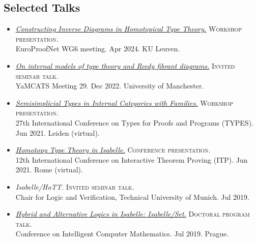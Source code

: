 \documentclass[12pt,a4paper]{article}
\begin{document}
\subsection{Selected Talks}

\newcommand{\vid}{{\scriptsize\faVideoCamera}\hspace{0.5ex}}
\newcommand{\slides}{{\scriptsize\faDesktop}\hspace{0.5ex}}

\begin{itemize}
\item
  \href{https://youtu.be/cB9hml8YBj4}{\emph{Constructing Inverse Diagrams in Homotopical Type Theory.}}
  \textsc{Workshop presentation.}\\
  EuroProofNet WG6 meeting.
  Apr 2024.
  KU Leuven.
\item
  \href{https://conferences.leeds.ac.uk/yamcats/meeting-29/}{\emph{On internal models of type theory and Reedy fibrant diagrams.}}
  \textsc{Invited seminar talk.}\\
  YaMCATS Meeting 29.
  Dec 2022.
  University of Manchester.
\item
  \href{https://joshchen.io/media/semisimplicial-types-in-internal-categories-with-families.mp4}{\emph{Semisimplicial Types in Internal Categories with Families.}}
  \textsc{Workshop presentation.}\\
  27th International Conference on Types for Proofs and Programs (TYPES).
  Jun 2021.
  Leiden (virtual).
\item
  \href{https://youtu.be/fGnIdt_jPfA?t=4630}{\emph{Homotopy Type Theory in Isabelle.}}
  \textsc{Conference presentation.}\\
  12th International Conference on Interactive Theorem Proving (ITP).
  Jun 2021.
  Rome (virtual).
\item
  \emph{Isabelle/HoTT.}
  \textsc{Invited seminar talk.}\\
  Chair for Logic and Verification, Technical University of Munich.
  Jul 2019.
\item
\href{https://joshchen.io/pdf/cicm-2019-slides.pdf}{\emph{Hybrid and Alternative Logics in Isabelle: Isabelle/Set.}}
  \textsc{Doctoral program talk.}\\
  Conference on Intelligent Computer Mathematics.
  Jul 2019.
  Prague.
\end{itemize}
\end{document}
